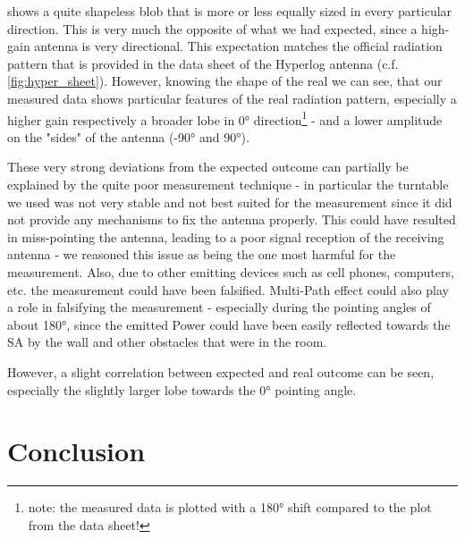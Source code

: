 
 shows a quite shapeless blob that is more or less equally sized in every particular direction. This is very much the opposite of what we had expected, since a high-gain antenna is very directional. This expectation matches the official radiation pattern that is provided in the data sheet of the Hyperlog antenna (c.f. \cref{fig:hyper_sheet}). However, knowing the shape of the real we can see, that our measured data shows particular features of the real radiation pattern, especially a higher gain respectively a broader lobe in 0° direction\footnote{note: the measured data is plotted with a 180° shift compared to the plot from the data sheet!} - and a lower amplitude on the "sides" of the antenna (-90° and 90°).

These very strong deviations from the expected outcome can partially be explained by the quite poor measurement technique - in particular the turntable we used was not very stable and not best suited for the measurement since it did not provide any mechanisms to fix the antenna properly. This could have resulted in miss-pointing the antenna, leading to a poor signal reception of the receiving antenna -  we reasoned this issue as being the one most harmful for the measurement. Also, due to other emitting devices such as cell phones, computers, etc. the measurement could have been falsified. Multi-Path effect could also play a role in falsifying the measurement - especially during the pointing angles of about 180°, since the emitted Power could have been easily reflected towards the SA by the wall and other obstacles that were in the room.

However, a slight correlation between expected and real outcome can be seen, especially the slightly larger lobe towards the 0° pointing angle.


\section{Conclusion}